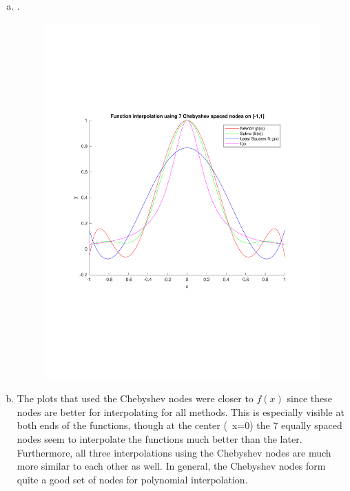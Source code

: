 \begin{enumerate}[1.]
\begin{enumerate}[(a)]
\item.
\begin{figure}[hb!]
\includegraphics[width=\textwidth]{q2b.pdf}
\end{figure}



\newpage

\item The plots that used the Chebyshev nodes were closer to $f(x)$ since these nodes are better for interpolating for all methods. This is especially visible at both ends of the functions, though at the center (~x=0) the $7$ equally spaced nodes seem to interpolate the functions much better than the later. Furthermore, all three interpolations using the Chebyshev nodes are much more similar to each other as well. In general, the Chebyshev nodes form quite a good set of nodes for polynomial interpolation.\\

\end{enumerate}


\end{enumerate}
